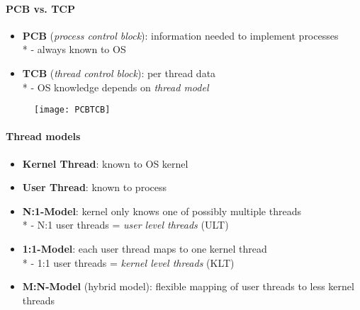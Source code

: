 \paragraph{PCB vs. TCP}
\begin{itemize}
  \item \textbf{PCB} (\emph{process control block}): information needed to implement processes \\*
    - always known to OS
  \item \textbf{TCB} (\emph{thread control block}): per thread data \\*
    - OS knowledge depends on \emph{thread model}
\end{itemize}
\begin{figure}[h]\centering\label{PCBTCB}\texttt{[image: PCBTCB]}\end{figure}

\paragraph{Thread models}
\begin{itemize}
  \item \textbf{Kernel Thread}: known to OS kernel
  \item \textbf{User Thread}: known to process
  \item \textbf{N:1-Model}: kernel only knows one of possibly multiple threads \\*
    - N:1 user threads = \emph{user level threads} (ULT)
  \item \textbf{1:1-Model}: each user thread maps to one kernel thread \\*
    - 1:1 user threads = \emph{kernel level threads} (KLT)
  \item \textbf{M:N-Model} (hybrid model): flexible mapping of user threads to less kernel threads 
\end{itemize}

